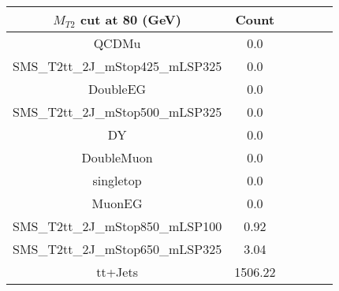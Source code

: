 \documentclass[8pt]{article}
\begin{document}
\begin{tabular}{|c|c|c|c|c|c|}
\hline
$M_{T2}$ cut at 80 (GeV) & Count \\
\hline
\hline
QCDMu & 0.0\\
SMS\_T2tt\_2J\_mStop425\_mLSP325 & 0.0\\
DoubleEG & 0.0\\
SMS\_T2tt\_2J\_mStop500\_mLSP325 & 0.0\\
DY & 0.0\\
DoubleMuon & 0.0\\
singletop & 0.0\\
MuonEG & 0.0\\
SMS\_T2tt\_2J\_mStop850\_mLSP100 & 0.92\\
SMS\_T2tt\_2J\_mStop650\_mLSP325 & 3.04\\
tt+Jets & 1506.22\\
\hline
\hline
\end{tabular}
\end{document}
